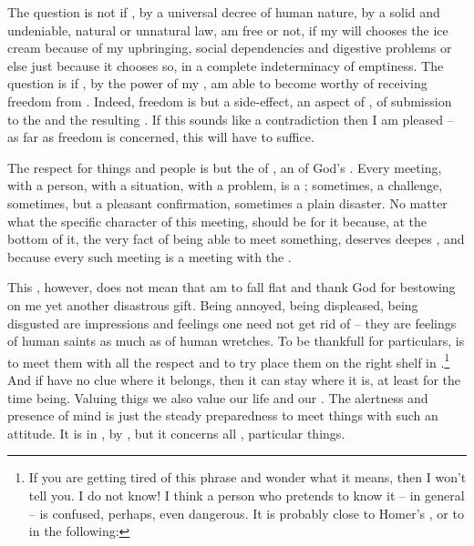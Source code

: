 \pa The question is not if , by a universal decree of human
nature, by a solid and undeniable, natural or unnatural law, am free
or not, if my will chooses the ice cream because of my upbringing,
social dependencies and digestive problems or else just because it
chooses so, in a complete indeterminacy of emptiness.  The question is
 if , by the power of my , am able to become
worthy of receiving freedom from .  Indeed, freedom is but a
side-effect, an aspect of , of submission to the 
and the resulting .  If this sounds like a
contradiction then I am pleased -- as far as freedom is concerned,
this will have to suffice.

The respect for things and people is but
the  of , an  of 
God's .
Every meeting, with a person,
with a situation, with a problem, is a ; sometimes, a
challenge, sometimes, but a pleasant confirmation, sometimes a plain
disaster.  No matter what the specific character of this meeting,
 should be  for it because, at the bottom of it,
the very fact of being able to meet something, deserves deepes
, and because every such meeting is a meeting with 
the .  

This , however, does not mean that  am to fall
flat and thank God for bestowing on me yet another disastrous gift. 
Being annoyed, being displeased, being disgusted are impressions and
feelings one need not get rid of -- they are feelings of human saints
as much as of human wretches.  To be thankfull for particulars, is to
meet them with all the respect and to try place them on the right
shelf in .\footnote{If you are getting tired
of this phrase and wonder what it means, then I won't tell you.  I do
not know!  I think a person who pretends to know it -- in general --
is confused, perhaps, even dangerous. It is probably close to Homer's
, or to  in
the following: } And if 
have no clue where it belongs, then it can stay where it is, at least for
the time being.  Valuing thigs we also value our life and 
our .  The alertness and presence of mind is just the
steady preparedness to meet things with such an attitude.  It is
 in , by , but it concerns 
all , particular things.

